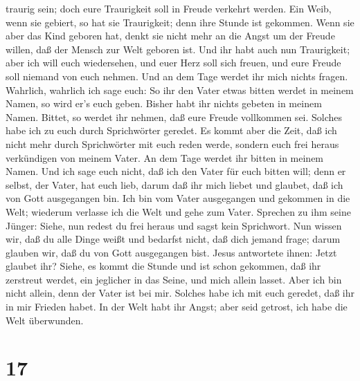 traurig sein; doch eure Traurigkeit soll in Freude verkehrt werden.
 Ein Weib, wenn sie gebiert, so hat sie Traurigkeit; denn
ihre Stunde ist gekommen. Wenn sie aber das Kind geboren hat, denkt sie
nicht mehr an die Angst um der Freude willen, daß der Mensch zur Welt
geboren ist.  Und ihr habt auch nun Traurigkeit; aber ich
will euch wiedersehen, und euer Herz soll sich freuen, und eure Freude
soll niemand von euch nehmen.  Und an dem Tage werdet ihr
mich nichts fragen. Wahrlich, wahrlich ich sage euch: So ihr den Vater
etwas bitten werdet in meinem Namen, so wird er's euch geben.
 Bisher habt ihr nichts gebeten in meinem Namen. Bittet, so
werdet ihr nehmen, daß eure Freude vollkommen sei.  Solches
habe ich zu euch durch Sprichwörter geredet. Es kommt aber die Zeit, daß
ich nicht mehr durch Sprichwörter mit euch reden werde, sondern euch
frei heraus verkündigen von meinem Vater.  An dem Tage
werdet ihr bitten in meinem Namen. Und ich sage euch nicht, daß ich den
Vater für euch bitten will;  denn er selbst, der Vater, hat
euch lieb, darum daß ihr mich liebet und glaubet, daß ich von Gott
ausgegangen bin.  Ich bin vom Vater ausgegangen und
gekommen in die Welt; wiederum verlasse ich die Welt und gehe zum Vater.
 Sprechen zu ihm seine Jünger: Siehe, nun redest du frei
heraus und sagst kein Sprichwort.  Nun wissen wir, daß du
alle Dinge weißt und bedarfst nicht, daß dich jemand frage; darum
glauben wir, daß du von Gott ausgegangen bist.  Jesus
antwortete ihnen: Jetzt glaubet ihr?  Siehe, es kommt die
Stunde und ist schon gekommen, daß ihr zerstreut werdet, ein jeglicher
in das Seine, und mich allein lasset. Aber ich bin nicht allein, denn
der Vater ist bei mir.  Solches habe ich mit euch geredet,
daß ihr in mir Frieden habet. In der Welt habt ihr Angst; aber seid
getrost, ich habe die Welt überwunden.

\hypertarget{section-16}{%
\section{17}\label{section-16}}

